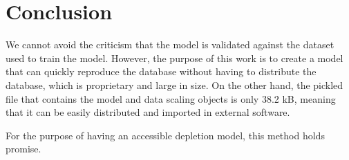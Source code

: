 \section{Conclusion}

We cannot avoid the criticism that the model is validated
against the dataset used to train the model. However, the purpose
of this work is to create a model that can quickly reproduce the
database without having to distribute the database, which is proprietary
and large in size. On the other hand, the pickled file that contains
the model and data scaling objects is only 38.2 kB, meaning that it
can be easily distributed and imported in external software.

For the purpose of having an accessible
depletion model, this method holds promise.

